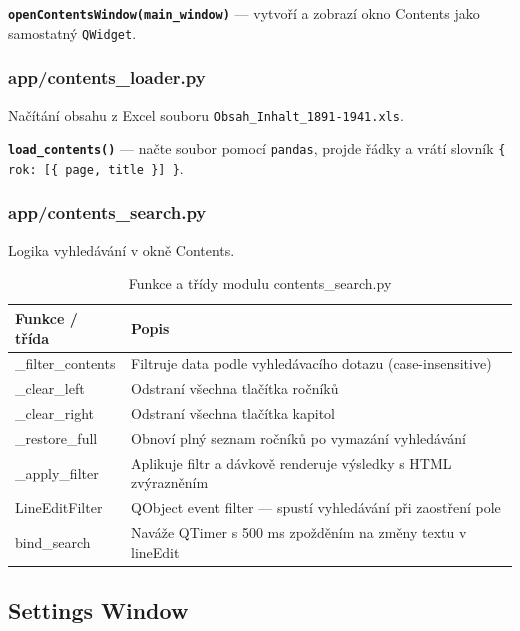 \documentclass[FM,Proj]{tulthesis}
\begin{document}
\textbf{\texttt{openContentsWindow(main\_window)}} — vytvoří a zobrazí okno Contents
jako samostatný \texttt{QWidget}.

\subsubsection{app/contents\_loader.py}

Načítání obsahu z Excel souboru \texttt{Obsah\_Inhalt\_1891-1941.xls}.

\textbf{\texttt{load\_contents()}} — načte soubor pomocí \texttt{pandas}, projde řádky
a vrátí slovník \texttt{\{ rok: [\{ page, title \}] \}}.

\subsubsection{app/contents\_search.py}

Logika vyhledávání v okně Contents.

\begin{table}[H]
	\centering
	\caption{Funkce a třídy modulu contents\_search.py}
	\begin{tabularx}{\textwidth}{|l|X|}
		\hline
		\textbf{Funkce / třída} & \textbf{Popis} \\ \hline
		\_filter\_contents & Filtruje data podle vyhledávacího dotazu (case-insensitive) \\ \hline
		\_clear\_left      & Odstraní všechna tlačítka ročníků \\ \hline
		\_clear\_right     & Odstraní všechna tlačítka kapitol \\ \hline
		\_restore\_full    & Obnoví plný seznam ročníků po vymazání vyhledávání \\ \hline
		\_apply\_filter    & Aplikuje filtr a dávkově renderuje výsledky s HTML zvýrazněním \\ \hline
		LineEditFilter     & QObject event filter — spustí vyhledávání při zaostření pole \\ \hline
		bind\_search       & Naváže QTimer s 500 ms zpožděním na změny textu v lineEdit \\ \hline
	\end{tabularx}
	\label{tab:contents-search}
\end{table}

\clearpage
\subsection{Settings Window}
\end{document}
